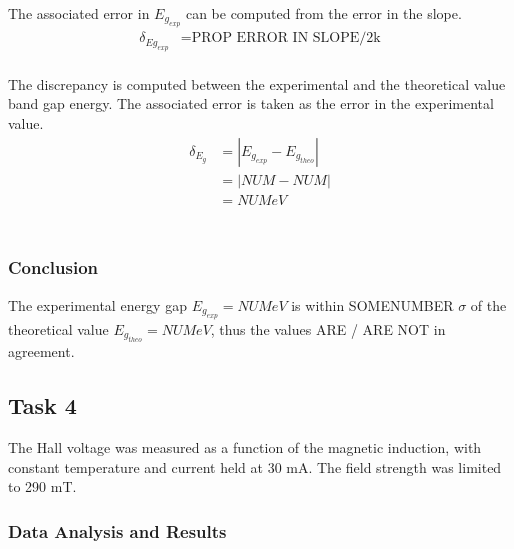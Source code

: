 \documentclass[a4paper]{article}
\begin{document}
The associated error in $E_{g_{exp}}$ can be computed from the error in the slope.
\begin{align*}
\delta_{Eg_{exp}} &= \text{PROP ERROR IN SLOPE/2k} \\
\end{align*}

\qq The discrepancy is computed between the experimental and the
theoretical value band gap energy. The associated error is taken as
the error in the experimental value.
\begin{align*}
\delta_{E_g} &= | E_{g_{exp}} - E_{g_{theo}} | \\
		     &= | NUM - NUM| \\
		     &= NUM eV \\
\end{align*}\\

\subsubsection{Conclusion}
\qq The experimental energy gap $E_{g_{exp}} = NUM eV$ is within
SOMENUMBER $\sigma$ of the theoretical value $E_{g_{theo}} = NUM eV$,
thus the values ARE / ARE NOT in agreement.

\subsection{Task 4}

\qq The Hall voltage was measured as a function of the magnetic
induction, with constant temperature and current held at 30 mA. 
The field strength was limited to 290 mT. 

\subsubsection{Data Analysis and Results}

\begin{figure}[H]
\centering
\label{task34plot}
\end{figure}
\end{document}
